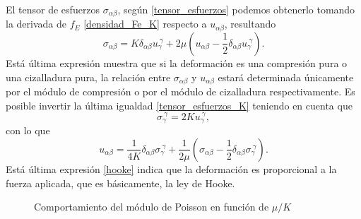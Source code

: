 El tensor de esfuerzos $\sigma_{\alpha\beta}$, según \eqref{tensor_esfuerzos}
podemos obtenerlo tomando la derivada de $f_E$ \eqref{densidad_Fe_K} respecto
a $u_{\alpha\beta}$, resultando
\begin{equation}\label{tensor_esfuerzos_K}
\sigma_{\alpha\beta}=K\delta_{\alpha\beta}u_{\gamma}^{\ \gamma}+2\mu\left(u_{\alpha\beta}-\frac{1}{2}\delta_{\alpha\beta}u_{\gamma}^{\ \gamma}\right).
\end{equation}
Está última expresión muestra que si la deformación es una compresión pura o una
cizalladura pura, la relación entre $\sigma_{\alpha\beta}$ y $u_{\alpha\beta}$
estará determinada únicamente por el módulo de compresión o por el módulo de
cizalladura respectivamente. Es posible invertir la última igualdad
\eqref{tensor_esfuerzos_K} teniendo en cuenta que
\begin{equation*}
\sigma_{\gamma}^{\ \gamma}=2 K u_{\gamma}^{\ \gamma},
\end{equation*}
con lo que
\begin{equation}\label{hooke}
u_{\alpha\beta}=\frac{1}{4K}\delta_{\alpha\beta}\sigma_{\gamma}^{\
  \gamma}+\frac{1}{2\mu}\left(\sigma_{\alpha\beta}-\frac{1}{2}\delta_{\alpha\beta}\sigma_{\gamma}^{\
    \gamma}\right).
\end{equation}
Está última expresión \eqref{hooke} indica que la deformación es proporcional
a la fuerza aplicada, que es básicamente, la ley de Hooke. 

\begin{figure}[h]
\centering
 \resizebox{\columnwidth}{!}{}
\caption{Comportamiento del módulo de Poisson en función de $\mu/K$}\label{esquema_Poisson}
\end{figure} 

